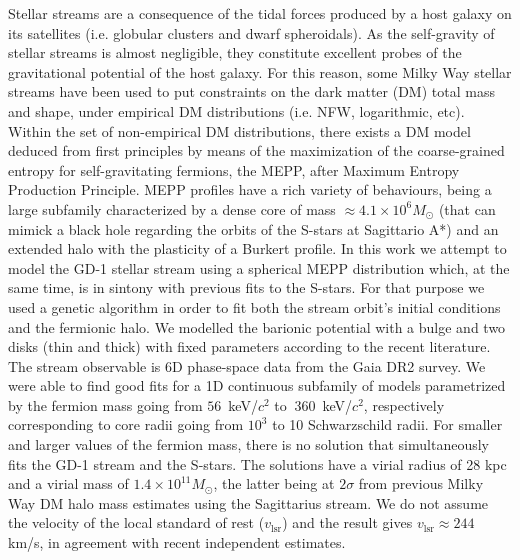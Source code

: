 \documentclass[twocolumn]{aa}
\begin{document}
  \abstract
   {Stellar streams are a consequence of the tidal forces produced by a host galaxy on its satellites (i.e. globular clusters and dwarf spheroidals).
   As the self-gravity of stellar streams is almost negligible, they constitute excellent probes of the gravitational potential of the host galaxy. For this reason, some Milky Way stellar streams have been used to put constraints on the dark matter (DM) total mass and shape, under empirical DM distributions (i.e. NFW, logarithmic, etc). Within the set of non-empirical DM distributions, there exists a DM model
   deduced from first principles by means of the maximization of the coarse-grained entropy for self-gravitating fermions, the MEPP, after Maximum Entropy Production Principle. MEPP profiles have a rich
   variety of behaviours, being a large subfamily characterized by a dense core of mass
   $\approx4.1\times10^6 M_\odot$ (that can mimick a black hole regarding the orbits of the S-stars at Sagittario A*) and an extended halo with the plasticity of a Burkert profile.}
   {In this work we attempt to model the GD-1 stellar stream using a spherical MEPP distribution which, at the same time, is in sintony with previous fits to the S-stars.}
   {For that purpose we used a genetic algorithm in order to fit both the stream orbit's initial conditions and the fermionic halo. We modelled the barionic potential with a bulge and two disks (thin and thick) with fixed parameters according to the recent literature. The stream observable is 6D phase-space data from the Gaia DR2 survey.}
   {We were able to find good fits for a 1D continuous subfamily of models parametrized by the fermion
   mass going from $56$~keV/$c^2$ to $~360$~keV/$c^2$, respectively corresponding to core radii going from
   $10^3$ to 10 Schwarzschild radii. For smaller and larger values of the fermion mass, there is no solution that simultaneously fits the GD-1 stream and the S-stars. The solutions have a virial radius of 28 kpc and a virial mass of $1.4\times10^{11} M_\odot$, the latter being at $2\sigma$ from previous Milky Way DM halo mass estimates using the Sagittarius stream. We do not assume the velocity of the local standard of rest ($v_\mathrm{lsr}$) and the result gives $v_\mathrm{lsr}\approx244$ km/s, in agreement with recent independent estimates.}
   {}

\end{document}

